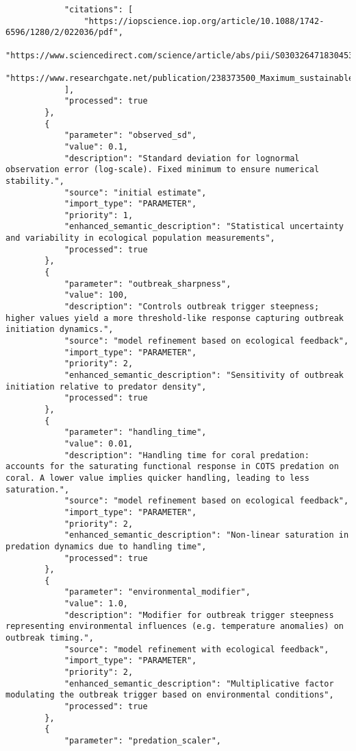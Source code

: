 \begin{lstlisting}
            "citations": [
                "https://iopscience.iop.org/article/10.1088/1742-6596/1280/2/022036/pdf",
                "https://www.sciencedirect.com/science/article/abs/pii/S0303264718304532",
                "https://www.researchgate.net/publication/238373500_Maximum_sustainable_yield_and_species_extinction_in_ecosystems"
            ],
            "processed": true
        },
        {
            "parameter": "observed_sd",
            "value": 0.1,
            "description": "Standard deviation for lognormal observation error (log-scale). Fixed minimum to ensure numerical stability.",
            "source": "initial estimate",
            "import_type": "PARAMETER",
            "priority": 1,
            "enhanced_semantic_description": "Statistical uncertainty and variability in ecological population measurements",
            "processed": true
        },
        {
            "parameter": "outbreak_sharpness",
            "value": 100,
            "description": "Controls outbreak trigger steepness; higher values yield a more threshold-like response capturing outbreak initiation dynamics.",
            "source": "model refinement based on ecological feedback",
            "import_type": "PARAMETER",
            "priority": 2,
            "enhanced_semantic_description": "Sensitivity of outbreak initiation relative to predator density",
            "processed": true
        },
        {
            "parameter": "handling_time",
            "value": 0.01,
            "description": "Handling time for coral predation: accounts for the saturating functional response in COTS predation on coral. A lower value implies quicker handling, leading to less saturation.",
            "source": "model refinement based on ecological feedback",
            "import_type": "PARAMETER",
            "priority": 2,
            "enhanced_semantic_description": "Non-linear saturation in predation dynamics due to handling time",
            "processed": true
        },
        {
            "parameter": "environmental_modifier",
            "value": 1.0,
            "description": "Modifier for outbreak trigger steepness representing environmental influences (e.g. temperature anomalies) on outbreak timing.",
            "source": "model refinement with ecological feedback",
            "import_type": "PARAMETER",
            "priority": 2,
            "enhanced_semantic_description": "Multiplicative factor modulating the outbreak trigger based on environmental conditions",
            "processed": true
        },
        {
            "parameter": "predation_scaler",

\end{lstlisting}
